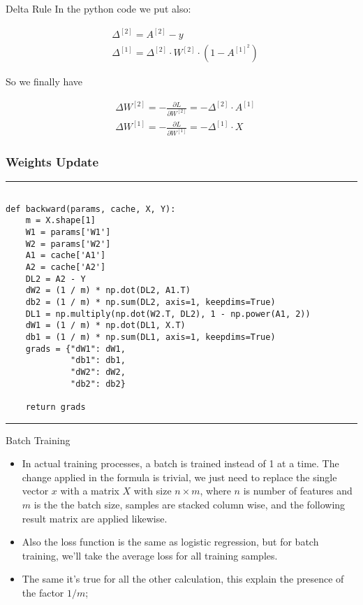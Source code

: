 \documentclass[11pt]{beamer}
\begin{document}
\begin{frame}{Delta Rule}
In the python code we put also:

\begin{align*} 
& \Delta^{[2]} = A^{[2]} - y  \\
& \Delta^{[1]} = \Delta^{[2]} \cdot W^{[2]} \cdot (1 - A^{[1]^2})
\end{align*}

So we finally have

\begin{align*}
& \Delta W^{[2]} = -\frac{\partial L}{\partial W^{[2]}} = - \Delta^{[2]} \cdot A^{[1]} \\
& \Delta W^{[1]} = -\frac{\partial L}{\partial W^{[1]}} = - \Delta^{[1]} \cdot X
\end{align*}

\end{frame}
\begin{frame}[fragile]
\frametitle{Weights Update}
\rule{\textwidth}{1pt}
\scriptsize
\begin{verbatim}

def backward(params, cache, X, Y):
    m = X.shape[1]
    W1 = params['W1']
    W2 = params['W2']
    A1 = cache['A1']
    A2 = cache['A2']
    DL2 = A2 - Y
    dW2 = (1 / m) * np.dot(DL2, A1.T)
    db2 = (1 / m) * np.sum(DL2, axis=1, keepdims=True)
    DL1 = np.multiply(np.dot(W2.T, DL2), 1 - np.power(A1, 2))
    dW1 = (1 / m) * np.dot(DL1, X.T)
    db1 = (1 / m) * np.sum(DL1, axis=1, keepdims=True)
    grads = {"dW1": dW1,
             "db1": db1,
             "dW2": dW2,
             "db2": db2}

    return grads
\end{verbatim}
\rule{\textwidth}{1pt}
\end{frame}
\begin{frame}{Batch Training}
\begin{itemize}
\item In actual training processes, a batch is trained instead of 1 at a time. The change applied in the formula is trivial, we just need to replace the single vector $x$ with a matrix $X$ with size $n \times m$, where $n$ is number of features and $m$ is the the batch size, samples are stacked column wise, and the following result matrix are applied likewise.
\item Also the loss function is the same as logistic regression, but for batch training, we'll take the average loss for all training samples.
\item The same it's true for all the other calculation, this explain the presence of the factor $1/m$;
\end{itemize}
\end{frame}
%
\end{document}
